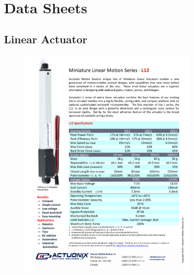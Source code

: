 \documentclass[../main.tex]{subfiles}
\begin{document}
	
\chapter{Data Sheets} \label{appendix:DataSheets}

\section{Linear Actuator \cite{LINEARACTUATOR}} \label{LinAct}
\begin{figure}[H]
	\centering
	\includegraphics[width=0.8\textwidth]{img/specs/Actuonix+L12+Datasheet.pdf}
\end{figure}

\end{document}
